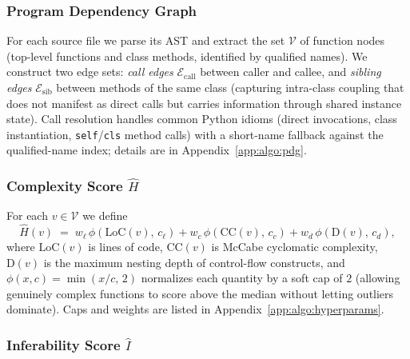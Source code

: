 \subsubsection{Program Dependency Graph}
\label{sec:method:pdg}

For each source file we parse its AST and extract the set $\mathcal{V}$
of function nodes (top-level functions and class methods, identified by
qualified names). We construct two edge sets: \emph{call edges}
$\mathcal{E}_{\mathrm{call}}$ between caller and callee, and
\emph{sibling edges} $\mathcal{E}_{\mathrm{sib}}$ between methods of the
same class (capturing intra-class coupling that does not manifest as
direct calls but carries information through shared instance state).
Call resolution handles common Python idioms (direct invocations, class
instantiation, \texttt{self}/\texttt{cls} method calls) with a
short-name fallback against the qualified-name index; details are in
Appendix~\ref{app:algo:pdg}.

\subsubsection{Complexity Score $\hat{H}$}
\label{sec:method:complexity}

For each $v \in \mathcal{V}$ we define
%
\begin{equation}
  \hat{H}(v) \;=\; w_{\ell}\,\phi\!\left(\mathrm{LoC}(v),\,c_{\ell}\right)
            + w_{c}\,\phi\!\left(\mathrm{CC}(v),\,c_{c}\right)
            + w_{d}\,\phi\!\left(\mathrm{D}(v),\,c_{d}\right),
  \label{eq:complexity}
\end{equation}
%
where $\mathrm{LoC}(v)$ is lines of code, $\mathrm{CC}(v)$ is McCabe
cyclomatic complexity, $\mathrm{D}(v)$ is the maximum nesting depth of
control-flow constructs, and $\phi(x, c) = \min(x / c,\, 2)$ normalizes
each quantity by a soft cap of $2$ (allowing genuinely complex functions
to score above the median without letting outliers dominate). Caps and
weights are listed in Appendix~\ref{app:algo:hyperparams}.

\subsubsection{Inferability Score $\hat{I}$}
\label{sec:method:inferability}

